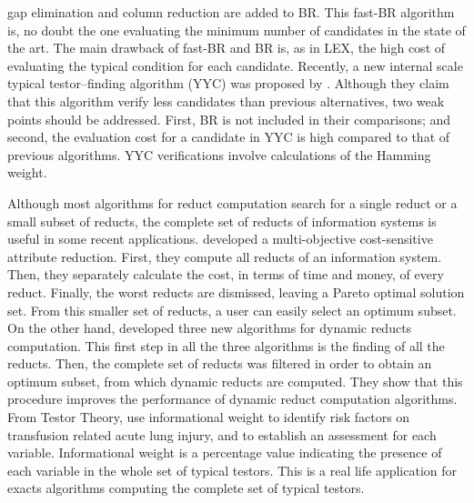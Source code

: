 \documentclass[authoryear,preprint,review,12pt]{elsarticle}
\begin{document}
  gap elimination and column reduction are added to BR. This fast-BR algorithm is, no doubt the one 
  evaluating the minimum number of candidates in the state of the art. The main drawback of fast-BR and 
  BR is, as in LEX, the high cost of evaluating the typical condition for each candidate.
  Recently, a new internal scale typical testor--finding algorithm (YYC) was proposed by \cite{Alba14}. 
  Although they claim that this algorithm verify less candidates than previous alternatives, two weak points should
  be addressed. First, BR is not included in their comparisons; and second, the evaluation cost for a candidate
  in YYC is high compared to that of previous algorithms. YYC verifications involve calculations of the 
  Hamming weight.
  
  
  Although most algorithms for reduct computation search for a single reduct or a small subset of reducts, 
  the complete set of reducts of information systems is useful in some recent applications. \cite{Xu2013}
  developed a multi-objective cost-sensitive attribute reduction. First, they compute all reducts of an 
  information system. Then, they separately calculate the cost, in terms of time and money, of every reduct. 
  Finally, the worst reducts are dismissed, leaving a Pareto optimal solution set. From this smaller set of 
  reducts, a user can easily select an optimum subset. On the other hand, \cite{Mukamakuza2014} developed 
  three new algorithms for dynamic reducts computation. 
  This first step in all the three algorithms is the finding of all the 
  reducts. Then, the complete set of reducts was filtered in order to obtain an optimum subset, from which 
  dynamic reducts are computed. They show that this procedure improves the performance of dynamic reduct 
  computation algorithms.	
  From Testor Theory, \cite{Torres2014} use informational weight to identify risk factors on transfusion 
  related acute lung injury, and to establish an assessment for each variable.  Informational weight is 
  a percentage value indicating the presence of each variable in the whole set of typical testors. This is 
  a real life application for exacts algorithms computing the complete set of typical testors.	
	
\end{document}
